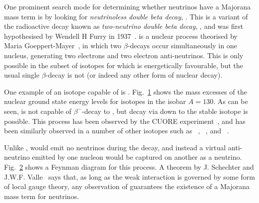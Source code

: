 One prominent search mode for determining whether neutrinos have a Majorana mass term is by looking for \textit{neutrinoless double beta decay}, \onbb{}. This is a variant of the radioactive decay known as \textit{two-neutrino double beta decay}, \twonbb{}, and was first hypothesised by Wendell H Furry in 1937~\cite{}. %
\twonbb{} is a nuclear process theorised by Maria Goeppert-Mayer~\cite{}, %
in which two $\beta$-decays occur simultaneously in one nucleus, generating two electrons and two electron anti-neutrinos. This is only possible in the subset of isotopes for which \twonbb{} is energetically favourable, but the usual single $\beta$-decay is not (or indeed any other form of nuclear decay).

One example of an isotope capable of \twonbb{} is . Fig.~\ref{fig:bb_isobar_example} shows the mass excesses of the nuclear ground state energy levels for isotopes in the isobar $A = 130$. As can be seen,  is not capable of $\beta^{-}$-decay to , but decay via \twonbb{} down to the stable isotope  is possible. This process has been observed by the CUORE experiment~\cite{}, %
and \twonbb{} has been similarly observed in a number of other isotopes such as ~\cite{}, %
~\cite{}, %
and ~\cite{}. %

\begin{figure}
    \centering
    \caption[]{}
    \label{fig:bb_isobar_example}
\end{figure}

Unlike \twonbb{}, \onbb{} would emit no neutrinos during the decay, and instead a virtual anti-neutrino emitted by one nucleon would be captured on another as a neutrino. Fig.~\ref{fig:feynman_diagram_ovbb} shows a Feynman diagram for this process. A theorem by J. Schechter and J.W.F. Valle~\cite{} %
says that, as long as the weak interaction is governed by some form of local gauge theory, any observation of \onbb{} guarantees the existence of a Majorana mass term for neutrinos.

\begin{figure}
    \centering
    \begin{subfigure}{0.48\textwidth}
        \centering
        \caption{}
        \label{fig:feynman_diagram_ovbb}
    \end{subfigure}
    \begin{subfigure}{0.48\textwidth}
        \centering
        \caption{}
        \label{fig:energy_spectrum_bb}
    \end{subfigure}
    \caption[]
    {}
    \label{fig:ovbb_plots}
\end{figure}

